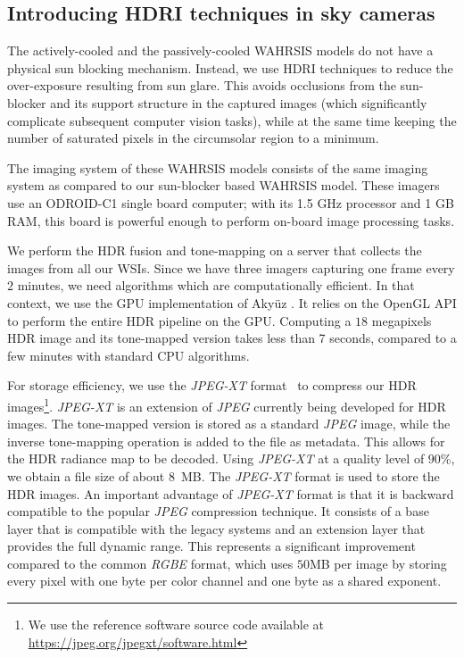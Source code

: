 \subsection{Introducing HDRI techniques in sky cameras}
The actively-cooled and the passively-cooled WAHRSIS models do not have a physical sun blocking mechanism. Instead, we use HDRI techniques to reduce the over-exposure resulting from sun glare. This avoids occlusions from the sun-blocker and its support structure in the captured images (which significantly complicate subsequent computer vision tasks), while at the same time keeping the number of saturated pixels in the circumsolar region to a minimum. 

The imaging system of these WAHRSIS models consists of the same imaging system as compared to our sun-blocker based WAHRSIS model. These imagers use an ODROID-C1 single board computer; with its 1.5 GHz processor and 1 GB RAM, this board is powerful enough to perform on-board image processing tasks. 

We perform the HDR fusion and tone-mapping on a server that collects the images from all our WSIs. Since we have three imagers capturing one frame every $2$ minutes, we need algorithms which are computationally efficient. 
In that context, we use the GPU implementation of Aky\"uz \cite{akyuz2012high}. It relies on the OpenGL API to perform the entire HDR pipeline on the GPU. Computing a $18$ megapixels HDR image and its tone-mapped version takes less than 7 seconds, compared to a few minutes with standard CPU algorithms. 

For storage efficiency, we use the \emph{JPEG-XT} format~\cite{jpegxt} to compress our HDR images\footnote{We use the reference software source code available at \url{https://jpeg.org/jpegxt/software.html}}. \emph{JPEG-XT} is an extension of \emph{JPEG} currently being developed for HDR images. The tone-mapped version is stored as a standard \emph{JPEG} image, while the inverse tone-mapping operation is added to the file as metadata. This allows for the HDR radiance map to be decoded.  Using \emph{JPEG-XT} at a quality level of $90$\%, we obtain a file size of about $8$~MB. The \emph{JPEG-XT} format is used to store the HDR images. An important advantage of \emph{JPEG-XT} format is that it is backward compatible to the popular \emph{JPEG} compression technique. It consists of a base layer that is compatible with the legacy systems and an extension layer that provides the full dynamic range. This represents a significant improvement compared to the common \emph{RGBE} format, which uses $50$MB per image by storing every pixel with one byte per color channel and one byte as a shared exponent.


